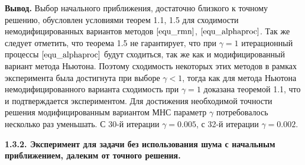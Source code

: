 {\bfseries\large Вывод.} Выбор начального приближения, достаточно близкого к точному решению, обусловлен условиями теорем 1.1, 1.5 для сходимости немодифицированных вариантов методов $\eqref{equ_rmn}$, $\eqref{equ_alphaproc}$. Так же следует отметить, что теорема 1.5 не гарантирует, что при $\gamma=1$ итерационный процессы $\eqref{equ_alphaproc}$ будут сходиться, так же как и модифицированный вариант метода Ньютона. Поэтому сходимость некоторых этих методов в рамках эксперимента была достигнута при выборе $\gamma<1$, тогда как для метода Ньютона немодифицированного варианта сходимость при $\gamma=1$ доказана теоремой 1.1, что и подтверждается экспериментом. Для достижения необходимой точности решения модифицированным вариантом МНС параметр $\gamma$ потребовалось несколько раз уменьшать. С 30-й итерации $\gamma=0.005$, с 32-й итерации $\gamma=0.002$.

{\bfseries 1.3.2. Эксперимент для задачи без использования шума с начальным приближением, далеким от точного решения.} 

